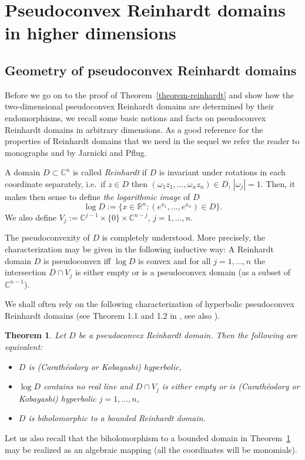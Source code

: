\documentclass[a4paper,12pt]{amsart}
\newtheorem{theorem}{Theorem}[section]
\theoremstyle{definition}
\begin{document}
\section{Pseudoconvex Reinhardt domains in higher dimensions} 

\subsection{Geometry of pseudoconvex Reinhardt domains} Before we go on to the proof of Theorem~\ref{theorem-reinhardt} and show how the two-dimensional pseudoconvex Reinhardt domains are determined by their endomorphisms, we recall some basic notions and facts on pseudoconvex Reinhardt domains in arbitrary dimensions. As a good reference for the properties of Reinhardt domains that we need in the sequel we refer the reader to monographs \cite{MR2396710} and \cite{MR4201928} by Jarnicki and Pflug.

A domain $D\subset\mathbb C^n$ is called {\it Reinhardt} if $D$ is invariant under rotations in each coordinate separately, i.e.\ if $z\in D$ then $(\omega_1z_1,\ldots,\omega_nz_n)\in D$, $|\omega_j|=1$. Then, it makes then sense to define {\it the logarithmic image} of $D$
\begin{equation}
    \log D:=\{x\in\mathbb R^n:(e^{x_1},\ldots,e^{x_n})\in D\}.
\end{equation}
We also define $V_j:=\mathbb C^{j-1}\times\{0\}\times\mathbb C^{n-j}$, $j=1,\ldots,n$.

The pseudoconvexity of $D$ is completely understood. More precisely, 
the characterization may be given in the following inductive way: A Reinhardt domain $D$ is pseudoconvex iff $\log D$ is convex and for all $j=1,\ldots,n$ the intersection $D\cap V_j$ is either empty or is a pseudoconvex domain (as a subset of $\mathbb C^{n-1}$).

We shall often rely on the following characterization of hyperbolic pseudoconvex Reinhardt domains (see Theorem 1.1 and 1.2 in \cite{MR1678013}, see also \cite{MR1785672}).
\begin{theorem}\label{theorem:hyperbolic-reinhardt}
    Let $D$ be a pseudoconvex Reinhardt domain. Then the following are equivalent:
    \begin{itemize}
        \item $D$ is (Carath\'eodory or Kobayashi) hyperbolic,
        \item $\log D$ contains no real line and $D\cap V_j$ is either empty or is (Carath\'eodory or Kobayashi) hyperbolic $j=1,\ldots,n$,
        \item $D$ is biholomorphic to a bounded Reinhardt domain.
    \end{itemize}
\end{theorem}
Let us also recall that the biholomorphism to a bounded domain in Theorem~\ref{theorem:hyperbolic-reinhardt} may be realized as an algebraic mapping (all the coordinates will be monomials).
\end{document}
